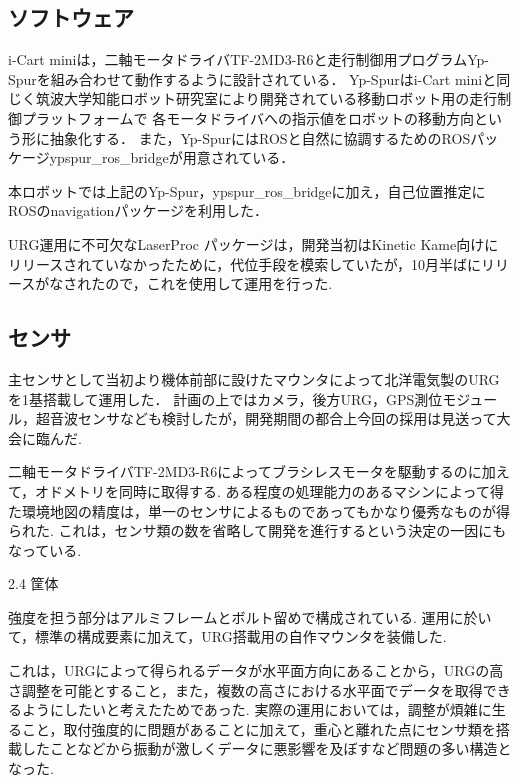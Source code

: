 \documentclass[twocolumn,10pt,a4paper]{jsarticle}
\begin{document}

\subsection{ソフトウェア}
  i-Cart miniは，二軸モータドライバTF-2MD3-R6と走行制御用プログラムYp-Spurを組み合わせて動作するように設計されている．
  Yp-Spurはi-Cart miniと同じく筑波大学知能ロボット研究室により開発されている移動ロボット用の走行制御プラットフォームで
  各モータドライバへの指示値をロボットの移動方向という形に抽象化する\cite{ypspur}．
  また，Yp-SpurにはROSと自然に協調するためのROSパッケージypspur\_ros\_bridgeが用意されている．

  本ロボットでは上記のYp-Spur，ypspur\_ros\_bridgeに加え，自己位置推定にROSのnavigationパッケージを利用した．%


  URG運用に不可欠なLaserProc パッケージは，開発当初はKinetic Kame向けにリリースされていなかったために，代位手段を模索していたが，10月半ばにリリースがなされたので，これを使用して運用を行った.

\subsection{センサ}
  主センサとして当初より機体前部に設けたマウンタによって北洋電気製のURGを1基搭載して運用した．
  計画の上ではカメラ，後方URG，GPS測位モジュール，超音波センサなども検討したが，開発期間の都合上今回の採用は見送って大会に臨んだ.


二軸モータドライバTF-2MD3-R6によってブラシレスモータを駆動するのに加えて，オドメトリを同時に取得する. ある程度の処理能力のあるマシンによって得た環境地図の精度は，単一のセンサによるものであってもかなり優秀なものが得られた.
 これは，センサ類の数を省略して開発を進行するという決定の一因にもなっている.

 2.4 筐体

強度を担う部分はアルミフレームとボルト留めで構成されている. 運用に於いて，標準の構成要素に加えて，URG搭載用の自作マウンタを装備した.

これは，URGによって得られるデータが水平面方向にあることから，URGの高さ調整を可能とすること，また，複数の高さにおける水平面でデータを取得できるようにしたいと考えたためであった.
実際の運用においては，調整が煩雑に生ること，取付強度的に問題があることに加えて，重心と離れた点にセンサ類を搭載したことなどから振動が激しくデータに悪影響を及ぼすなど問題の多い構造となった.
\end{document}
